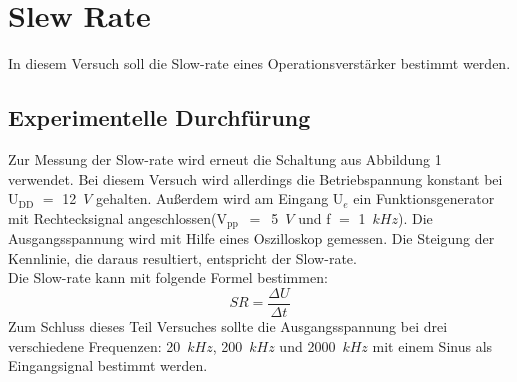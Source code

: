 \section{Slew Rate}
In diesem Versuch soll die Slow-rate eines Operationsverst\"arker bestimmt werden.
\subsection{Experimentelle Durchf\"urung}
Zur Messung der Slow-rate wird erneut die Schaltung aus Abbildung 1 verwendet. Bei diesem Versuch wird allerdings die Betriebspannung konstant bei U$_{\text{DD}}$ $=$ 12~$V$ gehalten. Au\ss erdem wird am Eingang U$_e$ ein Funktionsgenerator mit Rechtecksignal angeschlossen(V$_{\text{pp}}$~$=$~5~$V$ und f $=$ 1~$kHz$). Die Ausgangsspannung wird mit Hilfe eines Oszilloskop gemessen. Die Steigung der Kennlinie, die daraus resultiert, entspricht der Slow-rate. \\
Die Slow-rate kann mit folgende Formel bestimmen:
\begin{equation*}
SR = \frac{\Delta U}{\Delta t}
\end{equation*}
Zum Schluss dieses Teil Versuches sollte die Ausgangsspannung bei drei verschiedene Frequenzen: 20~$kHz$, 200~$kHz$ und 2000~$kHz$ mit einem Sinus als Eingangsignal bestimmt werden.
